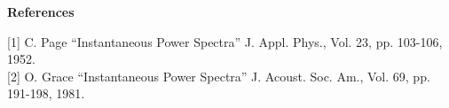 {\bf \large {}\selectfont References}\\
\hspace*{1.5cm}
\begin{minipage}[t]{13.5cm}
[1] C. Page ``Instantaneous Power Spectra'' J. Appl. Phys., Vol. 23,
pp. 103-106, 1952.  \\

[2] O. Grace ``Instantaneous Power Spectra'' J. Acoust. Soc. Am., Vol. 69,
pp. 191-198, 1981.
\end{minipage}
